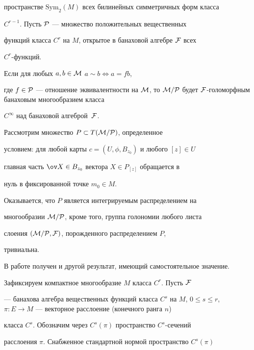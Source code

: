 пространстве $\text{Sym}_2(M)$ всех билинейных симметричных форм класса 


$C^{r-1}$. Пусть $\cal P$ --- множество положительных вещественных 


функций класса $C^r$ на $M$, открытое в банаховой алгебре $\cal F$ всех 


$C^r$-функций. 


 


Если для любых $a,b\in\cal M$\; $a\sim b\Leftrightarrow a=f b$, 


где $f\in\cal P$ --- отношение эквивалентности на $\cal M$, то $\cal 


M/\cal P$ будет $\cal F$-голоморфным банаховым многообразием класса 


$C^\infty$ над банаховой алгеброй~$\cal F$. 


 


Рассмотрим множество $P\subset T(\cal M/\cal P)$, определенное 


условием: для любой карты $c=(U,\phi,B_{z_0})$ и любого $[z]\in U$ 


главная часть $\ov X\in B_{z_0}$ вектора $X\in P_{[z]}$ обращается в 


нуль в фиксированной точке $m_0\in M$. 


 


Оказывается, что $P$ является интегрируемым распределением на 


многообразии $\cal M/\cal P$, кроме того, группа голономии любого листа 


слоения $(\cal M/\cal P,F)$, порожденного распределением $P$, 


тривиальна. 


 


В работе получен и другой результат, имеющий самостоятельное значение. 


Зафиксируем компактное многообразие $M$ класса $C^r$. Пусть $\cal F$ 


--- банахова алгебра вещественных функций класса $C^s$ на $M$, $0\le 


s\le r$, $\pi:E\to M$ --- векторное расслоение (конечного ранга $n$) 


класса $C^s$. Обозначим через $C^s(\pi)$ пространство $C^s$-сечений 


расслоения $\pi$. Снабженное стандартной нормой пространство $C^s(\pi)$ 


